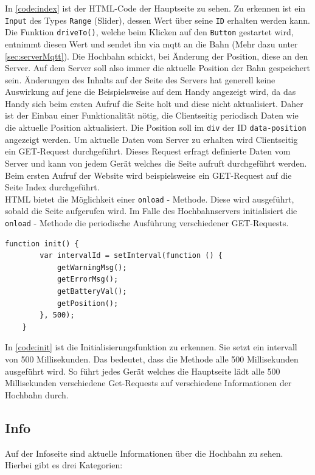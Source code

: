 In \autoref{code:index} ist der HTML-Code der Hauptseite zu sehen. Zu erkennen ist ein \texttt{Input} des Types \texttt{Range} (Slider), dessen Wert über seine \texttt{ID} erhalten werden kann. Die Funktion \texttt{driveTo()}, welche beim Klicken auf den \texttt{Button} gestartet wird, entnimmt diesen Wert und sendet ihn via \acrshort{mqtt} an die Bahn (Mehr dazu unter \autoref{sec:serverMqtt}). Die Hochbahn schickt, bei Änderung der Position, diese an den Server. Auf dem Server soll also immer die aktuelle Position der Bahn gespeichert sein. Änderungen des Inhalts auf der Seite des Servers hat generell keine Auswirkung auf jene die Beispielsweise auf dem Handy angezeigt wird, da das Handy sich beim ersten Aufruf die Seite holt und diese nicht aktualisiert. Daher ist der Einbau einer Funktionalität nötig, die Clientseitig periodisch Daten wie die aktuelle Position aktualisiert. Die Position soll im \texttt{div} der ID \texttt{data-position} angezeigt werden. Um aktuelle Daten vom Server zu erhalten wird Clientseitig ein GET-Request durchgeführt. Dieses Request erfragt definierte Daten vom Server und kann von jedem Gerät welches die Seite aufruft durchgeführt werden. Beim ersten Aufruf der Website wird beispielsweise ein GET-Request auf die Seite Index durchgeführt. \\
HTML bietet die Möglichkeit einer \texttt{onload} - Methode. Diese wird ausgeführt, sobald die Seite aufgerufen wird. Im Falle des Hochbahnservers initialisiert die \texttt{onload} - Methode die periodische Ausführung verschiedener GET-Requests. 
\vspace{0.5cm}
\begin{lstlisting}[language=html, style=dhpaperdefault]
	function init() {
		var intervalId = setInterval(function () {
			getWarningMsg();
			getErrorMsg();
			getBatteryVal();
			getPosition();
		}, 500);
	}
\end{lstlisting}
\vspace{0.5cm}
In \autoref{code:init} ist die Initialisierungsfunktion zu erkennen. Sie setzt ein intervall von 500 Millisekunden. Das bedeutet, dass die Methode alle 500 Millisekunden ausgeführt wird. So führt jedes Gerät welches die Hauptseite lädt alle 500 Millisekunden verschiedene Get-Requests auf verschiedene Informationen der Hochbahn durch. 

\subsection{Info}
Auf der Infoseite sind aktuelle Informationen über die Hochbahn zu sehen. Hierbei gibt es drei Kategorien:

